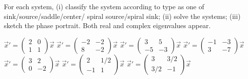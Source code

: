 \begin{exercise}\ansMark%
For each system, (i) classify the system according to type as one of sink/source/saddle/center/ spiral source/spiral sink; (ii) solve the systems; (iii) sketch the phase portrait. Both real and complex eigenvalues appear. %
\begin{multicols}{2}
\begin{tasks}
\task $\vec{x}'=\begin{pmatrix} 2&0 \\ 1&1 \end{pmatrix}\vec{x}$ %
\task $\vec{x}'=\begin{pmatrix} -2& -2\\ 8& -2\end{pmatrix}\vec{x}$ %
\task $\vec{x}'=\begin{pmatrix} 3& 5\\ -5& -3  \end{pmatrix}\vec{x}$ %
\task $\vec{x}' = \begin{pmatrix} -1 & -3 \\ 3 & -7 \end{pmatrix}\vec{x}$ %
\task $\vec{x}'=\begin{pmatrix} 3& 2\\ 0&-2 \end{pmatrix}\vec{x}$ %
\task $\vec{x}'=\begin{pmatrix} 2& 1/2 \\-1 & 1  \end{pmatrix}\vec{x}$ %
\task $\vec{x}'=\begin{pmatrix} 3& 3/2\\ 3/2 & -1 \end{pmatrix}\vec{x}$ %
\end{tasks}
\end{multicols}
\end{exercise}
